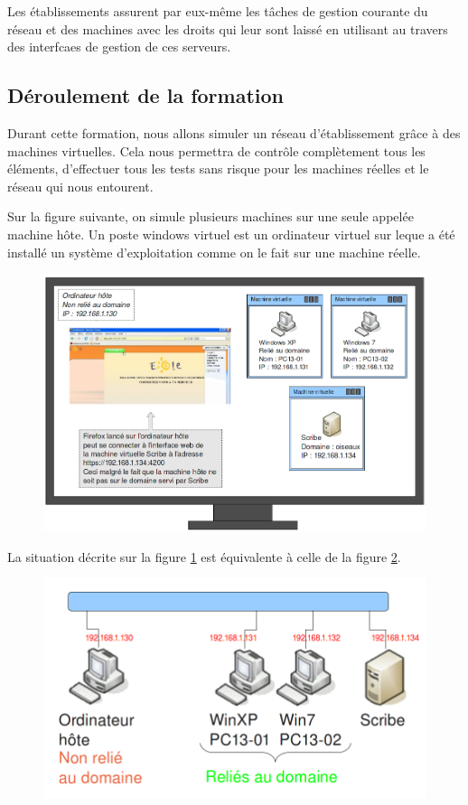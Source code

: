 \documentclass{article}
\makeatletter
\def\maxwidth{\ifdim\Gin@nat@width>\linewidth\linewidth
\else\Gin@nat@width\fi}
\let\Oldincludegraphics\includegraphics
\renewcommand{\includegraphics}[1]{\Oldincludegraphics[width=\maxwidth]{#1}}
\makeatother
\begin{document}
Les établissements assurent par eux-même les tâches de gestion courante
du réseau et des machines avec les droits qui leur sont laissé en
utilisant au travers des interfcaes de gestion de ces serveurs.

\subsection{Déroulement de la formation}

Durant cette formation, nous allons simuler un réseau d'établissement
grâce à des machines virtuelles. Cela nous permettra de contrôle
complètement tous les éléments, d'effectuer tous les tests sans risque
pour les machines réelles et le réseau qui nous entourent.

Sur la figure suivante, on simule plusieurs machines sur une seule
appelée machine hôte. Un poste windows virtuel est un ordinateur virtuel
sur leque a été installé un système d'exploitation comme on le fait sur
une machine réelle.

\begin{figure}[htbp]
\centering
\includegraphics{scribe_html_413f4ff1.png}
\caption{\label{413f4ff1}}
\end{figure}

La situation décrite sur la figure \ref{413f4ff1} est équivalente à
celle de la figure \ref{78733841}.

\begin{figure}[htbp]
\centering
\includegraphics{scribe_html_78733841.png}
\caption{\label{78733841}}
\end{figure}
\end{document}
